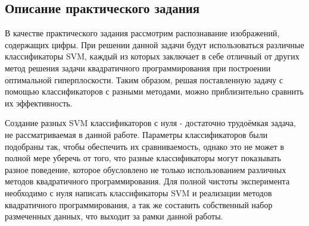 \documentclass[main.tex]{subfiles}
\begin{document}
\subsection{Описание практического задания}
В качестве практического задания рассмотрим распознавание изображений, содержащих цифры. При решении данной задачи будут использоваться различные классификаторы SVM, каждый из которых заключает в себе отличный от других метод решения задачи квадратичного программирования при построении оптимальной гиперплоскости. Таким образом, решая поставленную задачу с помощью классификаторов с разными методами, можно приблизительно сравнить их эффективность. 

Создание разных SVM классификаторов с нуля - достаточно трудоёмкая задача, не рассматриваемая в данной работе. Параметры классификаторов были подобраны так, чтобы обеспечить их сравниваемость, однако это не может в полной мере уберечь от того, что разные классификаторы могут показывать разное поведение, которое обусловлено не только использованием различных методов квадратичного программирования. Для полной чистоты эксперимента необходимо с нуля написать классификаторы SVM и реализации методов квадратичного программирования, а так же составить собственный набор размеченных данных, что выходит за рамки данной работы.
\end{document}
